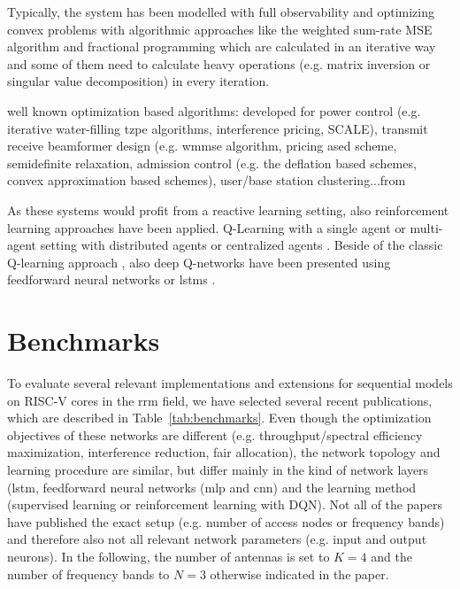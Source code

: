 Typically, the system has been modelled with full observability and optimizing convex problems with algorithmic\cite{Sun2017} approaches like the weighted sum-rate MSE algorithm\cite{shi2011iteratively} and fractional programming \cite{naeem2013optimal} which are calculated in an iterative way and some of them need to calculate heavy operations (e.g. matrix inversion or singular value decomposition) in every iteration.

\ifdefined\SHOWNOTES
well known optimization based algorithms: developed for power control (e.g. iterative water-filling tzpe algorithms, interference pricing, SCALE), transmit receive beamformer design (e.g. wmmse algorithm, pricing ased scheme, semidefinite relaxation, admission control (e.g. the deflation based schemes, convex approximation based schemes), user/base station clustering...from\cite{Sun2017}
\fi

As these systems would profit from a reactive learning setting, also reinforcement learning approaches have been applied. Q-Learning with a single agent \cite{galindo2010distributed,yau2009context,vu2018ultra} or multi-agent setting with distributed agents \cite{Ghadimi2017,calabrese2016learning,amiri2018machine} or centralized agents \cite{Nasir2018}. Beside of the classic Q-learning approach \cite{bennis2010q,simsek2011improved}, also deep Q-networks have been presented using feedforward neural networks \cite{Ye2017,Ghadimi2017,Yu2017,Nasir2018} or \glspl{lstm} \cite{Naparstek2017}.

\chapter{Benchmarks}
To evaluate several relevant implementations and extensions for sequential models on RISC-V cores in the \gls{rrm} field, we have selected several recent publications, which are described in Table~\ref{tab:benchmarks}. Even though the optimization objectives of these networks are different (e.g. throughput/spectral efficiency maximization, interference reduction, fair allocation), the network topology and learning procedure are similar, but differ mainly in the kind of network layers (\gls{lstm}, feedforward neural networks (\gls{mlp} and \gls{cnn}) and the learning method (supervised learning or reinforcement learning with DQN). 
Not all of the papers have published the exact setup (e.g. number of access nodes or frequency bands) and therefore also not all relevant network parameters (e.g. input and output neurons). In the following, the number of antennas is set to $K=4$ and the number of frequency bands to $N=3$ otherwise indicated in the paper.

